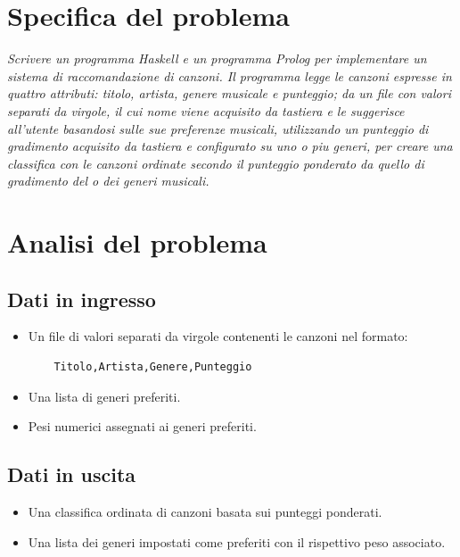 \documentclass[a4paper,11pt]{article}
\begin{document}
    \section{Specifica del problema}
    \textit
    {
        \noindent
        Scrivere un programma Haskell e un programma Prolog per implementare un sistema di raccomandazione
        di canzoni. Il programma legge le canzoni espresse in quattro attributi: titolo, artista,
        genere musicale e punteggio; da un file con valori separati da virgole, il cui nome viene acquisito
    da tastiera e le suggerisce all’utente basandosi sulle sue preferenze musicali, utilizzando un
    punteggio di gradimento acquisito da tastiera e configurato su uno o piu generi, per creare una
    classifica con le canzoni ordinate secondo il punteggio ponderato da quello di gradimento del o
    dei generi musicali.
    }

    \newpage
    \section{Analisi del problema}
    \subsection{Dati in ingresso}
    \begin{itemize}
        \item Un file di valori separati da virgole contenenti le canzoni nel formato:
        \begin{verbatim}
    Titolo,Artista,Genere,Punteggio
        \end{verbatim}
        \item Una lista di generi preferiti.
        \item Pesi numerici assegnati ai generi preferiti.
    \end{itemize}

    \subsection{Dati in uscita}
    \begin{itemize}
        \item Una classifica ordinata di canzoni basata sui punteggi ponderati.
        \item Una lista dei generi impostati come preferiti con il rispettivo peso associato.
    \end{itemize}
\end{document}
